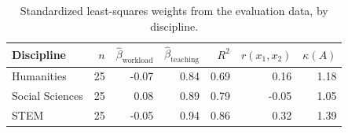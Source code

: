 \begin{table}[h]
  \centering
  \caption{Standardized least-squares weights from the evaluation data, by discipline.}
  \label{tab:betas}
\begin{tabular}{lrrrrrr}
\toprule
Discipline & $n$ & $\hat\beta_{\text{workload}}$ & $\hat\beta_{\text{teaching}}$ & $R^2$ & $r(x_1,x_2)$ & $\kappa(A)$ \\
\midrule
Humanities & 25 & -0.07 & 0.84 & 0.69 & 0.16 & 1.18 \\
Social Sciences & 25 & 0.08 & 0.89 & 0.79 & -0.05 & 1.05 \\
STEM & 25 & -0.05 & 0.94 & 0.86 & 0.32 & 1.39 \\
\bottomrule
\end{tabular}
\end{table}
